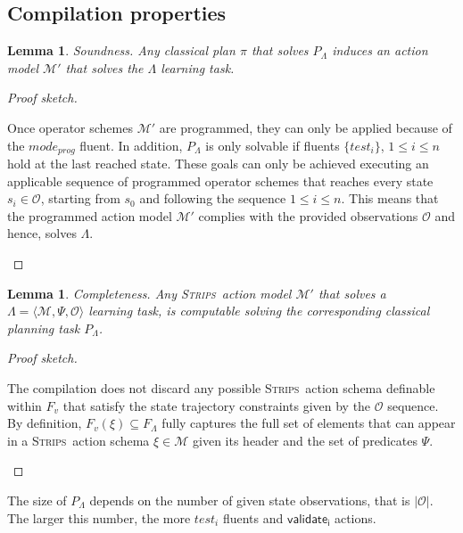 \documentclass{article}
\newcommand{\tup}[1]{{\langle #1 \rangle}}
\newcommand{\strips}{\textsc{Strips}}     %
\newtheorem{lemma}[theorem]{Lemma}
\begin{document}
\subsection{Compilation properties}

\begin{lemma}
Soundness. Any classical plan $\pi$ that solves $P_{\Lambda}$ induces an action model $\mathcal{M}'$ that solves the $\Lambda$ learning task.
\end{lemma}

\begin{proof}[Proof sketch]
\begin{small}
Once operator schemes $\mathcal{M}'$ are programmed, they can only be applied because of the $mode_{prog}$ fluent. In addition, $P_{\Lambda}$ is only solvable if fluents $\{test_i\}$, {\small $1\leq i\leq n$} hold at the last reached state. These goals can only be achieved executing an applicable sequence of programmed operator schemes that reaches every state $s_i\in\mathcal{O}$, starting from $s_0$ and following the sequence {\small $1\leq i\leq n$}. This means that the programmed action model $\mathcal{M}'$ complies with the provided observations $\mathcal{O}$ and hence, solves $\Lambda$.
\end{small}
\end{proof}


\begin{lemma}
Completeness. Any \strips\ action model $\mathcal{M}'$ that solves a $\Lambda=\tup{\mathcal{M},\Psi,\mathcal{O}}$ learning task, is computable solving the corresponding classical planning task $P_{\Lambda}$.
\end{lemma}

\begin{proof}[Proof sketch]
\begin{small}
The compilation does not discard any possible \strips\ action schema definable within $F_v$ that satisfy the state trajectory constraints given by the $\mathcal{O}$ sequence. By definition, $F_v(\xi)\subseteq F_\Lambda$ fully captures the full set of elements that can appear in a \strips\ action schema $\xi\in\mathcal{M}$ given its header and the set of predicates $\Psi$.
\end{small}
\end{proof}

The size of $P_{\Lambda}$ depends on the number of given state observations, that is $|\mathcal{O}|$. The larger this number, the more $test_i$ fluents and $\mathsf{validate_{i}}$ actions.
\end{document}

